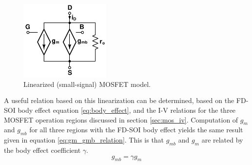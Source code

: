 		\begin{figure}[htb!]
		        \centering
		        \includegraphics[width=0.4\textwidth, angle=0]{./figs/theory/ss_model}
		    \caption{Linearized (small-signal) MOSFET model.}
		    \label{fig:ss_model}
		\end{figure}
		\FloatBarrier
	A useful relation based on this linearization can be determined, based on the FD-SOI body effect equation \ref{eq:body_effect}, and the I-V relations for the three MOSFET operation regions discussed in section \ref{sec:mos_iv}. Computation of $g_{m}$ and $g_{mb}$ for all three regions with the FD-SOI body effect yields the same result given in equation \ref{eq:gm_gmb_relation}. This is that $g_{mb}$ and $g_{m}$ are related by the body effect coefficient $\gamma$.
	\begin{equation}\label{eq:gm_gmb_relation}
	g_{mb} = \gamma g_{m}
	\end{equation}

		



